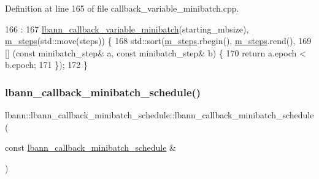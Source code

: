 Definition at line 165 of file callback\+\_\+variable\+\_\+minibatch.\+cpp.


\begin{DoxyCode}
166                                                         :
167   \hyperlink{classlbann_1_1lbann__callback__variable__minibatch_a970a03f0d297f8447020e85d23f5ee73}{lbann\_callback\_variable\_minibatch}(starting\_mbsize), 
      \hyperlink{classlbann_1_1lbann__callback__minibatch__schedule_a05084eeba07e54fa11eed1a414b7aeeb}{m\_steps}(std::move(steps)) \{
168   std::sort(\hyperlink{classlbann_1_1lbann__callback__minibatch__schedule_a05084eeba07e54fa11eed1a414b7aeeb}{m\_steps}.rbegin(), \hyperlink{classlbann_1_1lbann__callback__minibatch__schedule_a05084eeba07e54fa11eed1a414b7aeeb}{m\_steps}.rend(),
169             [] (\textcolor{keyword}{const} minibatch\_step& a, \textcolor{keyword}{const} minibatch\_step& b) \{
170               \textcolor{keywordflow}{return} a.epoch < b.epoch;
171             \});
172 \}
\end{DoxyCode}
\mbox{\label{classlbann_1_1lbann__callback__minibatch__schedule_a2b9849aed5002479815dc6372a544e80}} 
\subsubsection{\texorpdfstring{lbann\+\_\+callback\+\_\+minibatch\+\_\+schedule()}{lbann\_callback\_minibatch\_schedule()}\hspace{0.1cm}{\footnotesize\ttfamily [2/2]}}
{\footnotesize\ttfamily lbann\+::lbann\+\_\+callback\+\_\+minibatch\+\_\+schedule\+::lbann\+\_\+callback\+\_\+minibatch\+\_\+schedule (\begin{DoxyParamCaption}\item[{const \hyperlink{classlbann_1_1lbann__callback__minibatch__schedule}{lbann\+\_\+callback\+\_\+minibatch\+\_\+schedule} \&}]{ }\end{DoxyParamCaption})\hspace{0.3cm}{\ttfamily [default]}}



